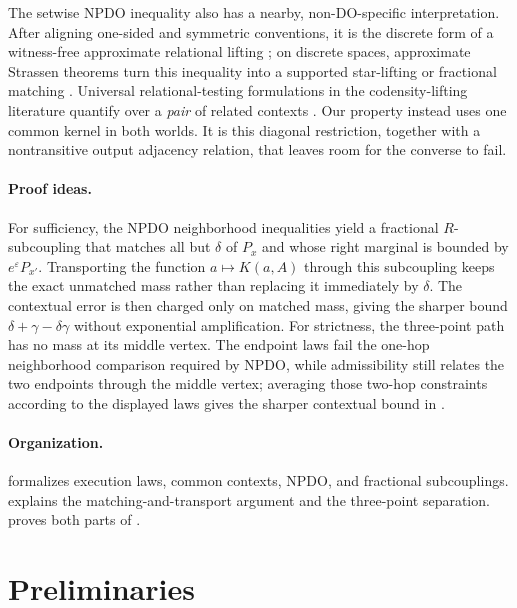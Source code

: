 \documentclass[11pt]{article}
\begin{document}
The setwise NPDO inequality also has a nearby, non-DO-specific interpretation.
After aligning one-sided and symmetric conventions, it is the discrete form of
a witness-free approximate relational lifting
\cite{Sato2016ApproximateRHL}; on discrete spaces, approximate Strassen
theorems turn this inequality into a supported star-lifting or fractional
matching \cite{BartheEtAl2019StarLiftings,ZhouEtAl2023NPDO}.  Universal
relational-testing formulations in the codensity-lifting literature quantify
over a \emph{pair}
of related contexts \cite{KatsumataEtAl2018Codensity,AguirreEtAl2021Adversarial}.
Our property instead uses one common kernel in both worlds.  It is this
diagonal restriction, together with a nontransitive output adjacency relation,
that leaves room for the converse to fail.

\paragraph{Proof ideas.}
For sufficiency, the NPDO neighborhood inequalities yield a fractional
$R$-subcoupling that matches all but $\delta$ of $P_x$ and whose right marginal
is bounded by $e^\varepsilon P_{x'}$.  Transporting the function
$a\mapsto K(a,A)$ through this subcoupling keeps the exact unmatched mass
rather than replacing it immediately by $\delta$.  The contextual error is
then charged only on matched mass, giving the sharper bound
$\delta+\gamma-\delta\gamma$ without exponential amplification.  For strictness, the
three-point path has no mass at its middle vertex.  The endpoint laws fail the
one-hop neighborhood comparison required by NPDO, while admissibility still
relates the two endpoints through the middle vertex; averaging those two-hop
constraints according to the displayed laws gives the sharper contextual
bound in .

\paragraph{Organization.}
 formalizes execution laws, common contexts, NPDO, and
fractional subcouplings.   explains the
matching-and-transport argument and the three-point separation.
 proves both parts of .

\section{Preliminaries}
\label{sec:preliminaries}
\end{document}
